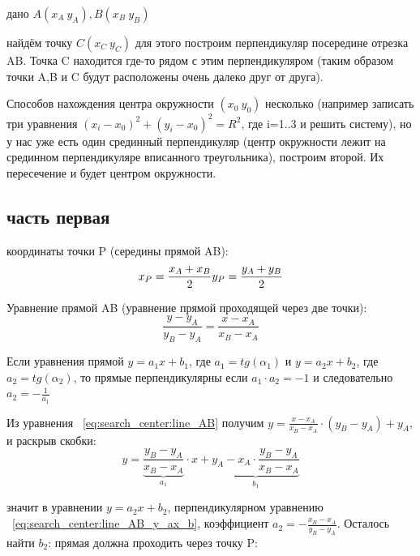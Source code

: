 \documentclass[unicode, 12pt, a4paper,oneside,fleqn]{article}
\begin{document}
дано $A(x_A \  y_A), B(x_B \  y_B)$

найдём точку $C(x_C \ y_C)$ для этого построим перпендикуляр
посередине отрезка AB. Точка C находится где-то рядом с этим
перпендикуляром (таким образом точки A,B и C будут расположены очень
далеко друг от друга).

Способов нахождения центра окружности $(x_0 \ y_0)$ несколько
(например записать три уравнения $(x_i - x_0)^2 + (y_i - x_0)^2 = R^2$,
 где i=1..3 и решить систему), но у нас уже есть один срединный
перпендикуляр (центр окружности лежит на срединном перпендикуляре
вписанного треугольника), построим второй. Их пересечение и будет
центром окружности.

\subsection{часть первая}
координаты точки P (середины прямой AB):
\begin{equation}
\label{eq:search_center:center_AB}
  x_P = \frac{x_A + x_B}{2} \\
  y_P = \frac{y_A + y_B}{2}
\end{equation}





Уравнение прямой AB (уравнение прямой проходящей через две точки):
\begin{equation}
\label{eq:search_center:line_AB}
\frac{y - y_A}{y_B - y_A} = \frac{x - x_A}{x_B - x_A}
\end{equation}






Если уравнения прямой $y = a_1x+b_1$, где $a_1 = tg(\alpha_1)$ и
$y = a_2x+b_2$, где $a_2 = tg(\alpha_2)$, то прямые перпендикулярны если
$a_1 \cdot a_2 = -1$ и следовательно $a_2 = -\frac{1}{a_1}$


Из уравнения ~\ref{eq:search_center:line_AB} получим
$y = \frac{x - x_A}{x_B - x_A} \cdot (y_B - y_A) + y_A$, и раскрыв скобки:
\begin{equation}
\label{eq:search_center:line_AB_y_ax_b}
y = \underbrace{\frac{y_B - y_A}{x_B - x_A}}_{a_1} \cdot x +  \underbrace{y_A - x_A \cdot \frac{y_B - y_A}{x_B - x_A}}_{b_1}
\end{equation}

значит в уравнении $y = a_2x + b_2$, перпендикулярном уравнению ~\ref{eq:search_center:line_AB_y_ax_b},
коэффициент $a_2 = -\frac{x_B - x_A}{y_B - y_A}$. Осталось найти $b_2$: прямая должна проходить через точку P:
\end{document}
